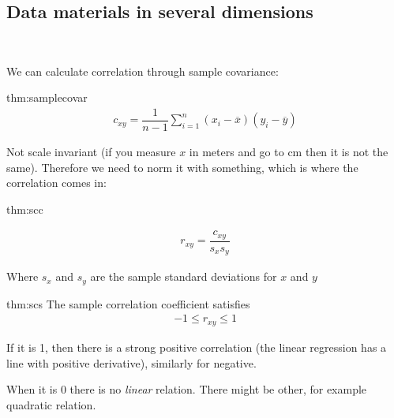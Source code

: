 \subsection{Data materials in several dimensions}\hfill\\\par
\noindent We can calculate correlation through sample covariance:
\par\bigskip
\begin{theo}{thm:samplecovar}
  \begin{equation*}
    \begin{gathered}
      c_{xy} = \dfrac{1}{n-1}\sum_{i=1}^{n}(x_i-\overline{x})(y_i-\overline{y})
    \end{gathered}
  \end{equation*}
\end{theo}\par
\noindent Not scale invariant (if you measure $x$ in meters and go to cm then it is not the same). Therefore we need to norm it with something, which is where the correlation comes in:
\par\bigskip
\begin{theo}{thm:scc}

  \begin{equation*}
    \begin{gathered}
      r_{xy} = \dfrac{c_{xy}}{s_xs_y}
    \end{gathered}
  \end{equation*}\par
  \noindent Where $s_x$ and $s_y$ are the sample standard deviations for $x$ and $y$
\end{theo}
\par\bigskip
\begin{theo}{thm:scs}
  The sample correlation coefficient satisfies
  \begin{equation*}
    \begin{gathered}
      -1\leq r_{xy}\leq 1
    \end{gathered}
  \end{equation*}\par
  \noindent If it is 1, then there is a strong positive correlation (the linear regression has a line with positive derivative), similarly for negative.\par
  \noindent When it is 0 there is no \textit{linear} relation. There might be other, for example quadratic relation.
\end{theo}
